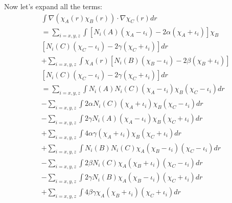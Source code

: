 Now let's expand all the terms:
\begin{equation}
 \begin{split}
&\int \nabla(\chi_{A}(r)\chi_{B}(r)) \cdot \nabla\chi_{C}(r) dr \\
&= \sum_{i = x, y, z} \int
[ N_{i}(A)(\chi_{A}-\iota_{i}) - 2\alpha(\chi_{A}+\iota_{i})] \chi_{B} \\
&[ N_{i}(C)(\chi_{C}-\iota_{i}) - 2\gamma(\chi_{C}+\iota_{i})] dr \\
&+ \sum_{i = x, y, z} \int 
\chi_{A}(r) \left[ 
N_{i}(B)(\chi_{B}-\iota_{i}) - 2\beta(\chi_{B}+\iota_{i})\right] \\
&\left[ N_{i}(C)(\chi_{C}-\iota_{i}) - 2\gamma(\chi_{C}+\iota_{i})\right]  dr \\
&= \sum_{i = x, y, z} \int 
 N_{i}(A)N_{i}(C)(\chi_{A}-\iota_{i})\chi_{B}(\chi_{C}-\iota_{i}) dr \\
&- \sum_{i = x, y, z} \int 
 2\alpha N_{i}(C)(\chi_{A}+\iota_{i})\chi_{B}(\chi_{C}-\iota_{i}) dr \\
&- \sum_{i = x, y, z} \int 
 2\gamma N_{i}(A)(\chi_{A}-\iota_{i})\chi_{B}(\chi_{C}+\iota_{i}) dr \\
&+ \sum_{i = x, y, z} \int 
 4\alpha\gamma   (\chi_{A}+\iota_{i})\chi_{B}(\chi_{C}+\iota_{i}) dr \\ 
&+ \sum_{i = x, y, z} \int 
 N_{i}(B)N_{i}(C)\chi_{A}(\chi_{B}-\iota_{i})(\chi_{C}-\iota_{i}) dr \\
&- \sum_{i = x, y, z} \int 
 2\beta  N_{i}(C)\chi_{A}(\chi_{B}+\iota_{i})(\chi_{C}-\iota_{i}) dr \\
&- \sum_{i = x, y, z} \int 
 2\gamma N_{i}(B)\chi_{A}(\chi_{B}-\iota_{i})(\chi_{C}+\iota_{i}) dr \\
&+ \sum_{i = x, y, z} \int 
 4\beta\gamma    \chi_{A}(\chi_{B}+\iota_{i})(\chi_{C}+\iota_{i}) dr  
 \end{split}
\label{three_body_kinetic_integral_eq:4}
\end{equation}

